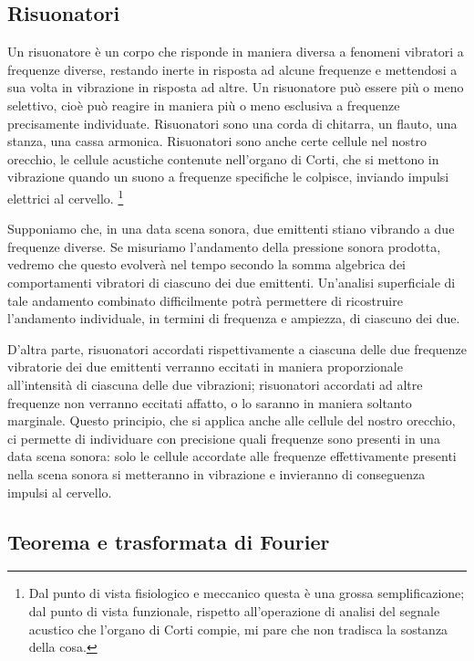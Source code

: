 \documentclass[11pt]{report}
\begin{document}
\subsection{Risuonatori} 

Un risuonatore è un corpo che risponde in maniera diversa a fenomeni vibratori a frequenze diverse, restando inerte in risposta ad alcune frequenze e mettendosi a sua volta in vibrazione in risposta ad altre. Un risuonatore può essere più o meno selettivo, cioè può reagire in maniera più o meno esclusiva a frequenze precisamente individuate. Risuonatori sono una corda di chitarra, un flauto, una stanza, una cassa armonica. Risuonatori sono anche certe cellule nel nostro orecchio, le cellule acustiche contenute nell'organo di Corti, che si mettono in vibrazione quando un suono a frequenze specifiche le colpisce, inviando impulsi elettrici al cervello.%
\footnote{Dal punto di vista fisiologico e meccanico questa è una grossa semplificazione; dal punto di vista funzionale, rispetto all'operazione di analisi del segnale acustico che l'organo di Corti compie, mi pare che non tradisca la sostanza della cosa.}

Supponiamo che, in una data scena sonora, due emittenti stiano vibrando a due frequenze diverse. Se misuriamo l'andamento della pressione sonora prodotta, vedremo che questo evolverà nel tempo secondo la somma algebrica dei comportamenti vibratori di ciascuno dei due emittenti. Un'analisi superficiale di tale andamento combinato difficilmente potrà permettere di ricostruire l'andamento individuale, in termini di frequenza e ampiezza, di ciascuno dei due.

D'altra parte, risuonatori accordati rispettivamente a ciascuna delle due frequenze vibratorie dei due emittenti verranno eccitati in maniera proporzionale all'intensità di ciascuna delle due vibrazioni; risuonatori accordati ad altre frequenze non verranno eccitati affatto, o lo saranno in maniera soltanto marginale. Questo principio, che si applica anche alle cellule del nostro orecchio, ci permette di individuare con precisione quali frequenze sono presenti in una data scena sonora: solo le cellule accordate alle frequenze effettivamente presenti nella scena sonora si metteranno in vibrazione e invieranno di conseguenza impulsi al cervello.


\subsection{Teorema e trasformata di Fourier}
\end{document}
